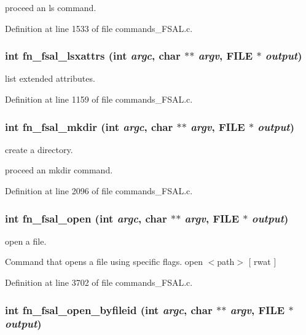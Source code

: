 proceed an ls command. 

Definition at line 1533 of file commands\_\-FSAL.c.
\subsubsection[{fn\_\-fsal\_\-lsxattrs}]{\setlength{\rightskip}{0pt plus 5cm}int fn\_\-fsal\_\-lsxattrs (int {\em argc}, \/  char $\ast$$\ast$ {\em argv}, \/  FILE $\ast$ {\em output})}\label{commands_8h_00fa31116fbbb892b0dfdd2b4b5d0c48}


list extended attributes. 

Definition at line 1159 of file commands\_\-FSAL.c.
\subsubsection[{fn\_\-fsal\_\-mkdir}]{\setlength{\rightskip}{0pt plus 5cm}int fn\_\-fsal\_\-mkdir (int {\em argc}, \/  char $\ast$$\ast$ {\em argv}, \/  FILE $\ast$ {\em output})}\label{commands_8h_fba8a873b1230bb40c5b57b56f30e600}


create a directory.

proceed an mkdir command. 

Definition at line 2096 of file commands\_\-FSAL.c.
\subsubsection[{fn\_\-fsal\_\-open}]{\setlength{\rightskip}{0pt plus 5cm}int fn\_\-fsal\_\-open (int {\em argc}, \/  char $\ast$$\ast$ {\em argv}, \/  FILE $\ast$ {\em output})}\label{commands_8h_7eb0d8c88e206ec8f0a2c3bc7b8586b5}


open a file.

Command that opens a file using specific flags. open $<$path$>$ [ rwat ] 

Definition at line 3702 of file commands\_\-FSAL.c.
\subsubsection[{fn\_\-fsal\_\-open\_\-byfileid}]{\setlength{\rightskip}{0pt plus 5cm}int fn\_\-fsal\_\-open\_\-byfileid (int {\em argc}, \/  char $\ast$$\ast$ {\em argv}, \/  FILE $\ast$ {\em output})}\label{commands_8h_2d40d85e39ad21317aee36aa87be48d0}


